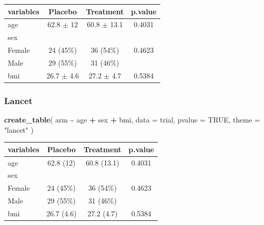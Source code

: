 \documentclass[
]{article}
\newenvironment{Shaded}{\begin{snugshade}}{\end{snugshade}}
\newcommand{\AttributeTok}[1]{\textcolor[rgb]{0.13,0.29,0.53}{#1}}
\newcommand{\ConstantTok}[1]{\textcolor[rgb]{0.56,0.35,0.01}{#1}}
\newcommand{\FunctionTok}[1]{\textcolor[rgb]{0.13,0.29,0.53}{\textbf{#1}}}
\newcommand{\NormalTok}[1]{#1}
\newcommand{\SpecialCharTok}[1]{\textcolor[rgb]{0.81,0.36,0.00}{\textbf{#1}}}
\newcommand{\StringTok}[1]{\textcolor[rgb]{0.31,0.60,0.02}{#1}}
\begin{document}
\begin{tabular}{lccc}
\toprule
\definecolor{nejmstripe}{HTML}{fefcf0}
\definecolor{nejmtext}{HTML}{333333}
\definecolor{nejmstripe}{HTML}{fefcf0}
\definecolor{nejmtext}{HTML}{333333}

\textbf{variables} & \textbf{Placebo} & \textbf{Treatment} & \textbf{p.value} \\
\midrule
age & 62.8 $\pm$ 12 & 60.8 $\pm$ 13.1 & 0.4031 \\
\rowcolor{nejmstripe} sex &  &  &  \\
\hspace{1em}Female & 24 (45\%) & 36 (54\%) & 0.4623 \\
\rowcolor{nejmstripe} \hspace{1em}Male & 29 (55\%) & 31 (46\%) &  \\
bmi & 26.7 $\pm$ 4.6 & 27.2 $\pm$ 4.7 & 0.5384 \\
\bottomrule
\end{tabular}

\subsubsection{Lancet}\label{lancet}

\begin{Shaded}
\begin{Highlighting}[]
\FunctionTok{create\_table}\NormalTok{(}
\NormalTok{  arm }\SpecialCharTok{\textasciitilde{}}\NormalTok{ age }\SpecialCharTok{+}\NormalTok{ sex }\SpecialCharTok{+}\NormalTok{ bmi,}
  \AttributeTok{data =}\NormalTok{ trial,}
  \AttributeTok{pvalue =} \ConstantTok{TRUE}\NormalTok{,}
  \AttributeTok{theme =} \StringTok{"lancet"}
\NormalTok{)}
\end{Highlighting}
\end{Shaded}

\begin{tabular}{lccc}
\toprule

\textbf{variables} & \textbf{Placebo} & \textbf{Treatment} & \textbf{p.value} \\
\midrule
age & 62.8 (12) & 60.8 (13.1) & 0.4031 \\
sex &  &  &  \\
\hspace{1em}Female & 24 (45\%) & 36 (54\%) & 0.4623 \\
\hspace{1em}Male & 29 (55\%) & 31 (46\%) &  \\
bmi & 26.7 (4.6) & 27.2 (4.7) & 0.5384 \\
\bottomrule
\end{tabular}
\end{document}
